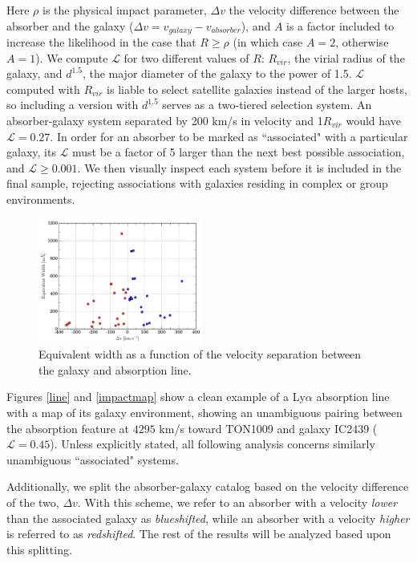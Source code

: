 \documentclass[iop]{emulateapj-rtx4}
\begin{document}
\noindent Here $\rho$ is the physical impact parameter, $\Delta v$ the velocity difference between the absorber and the galaxy ($\Delta v = v_{galaxy} - v_{absorber}$), and $A$ is a factor included to increase the likelihood in the case that $R \geq \rho$ (in which case $A = 2$, otherwise $A = 1$). We compute $\mathcal{L}$ for two different values of $R$: $R_{vir}$, the virial radius of the galaxy, and $d^{1.5}$, the major diameter of the galaxy to the power of 1.5. $\mathcal{L}$ computed with $R_{vir}$ is liable to select satellite galaxies instead of the larger hosts, so including a version with $d^{1.5}$ serves as a two-tiered selection system. An absorber-galaxy system separated by 200 km/s in velocity and 1$R_{vir}$ would have $\mathcal{L} = 0.27$. In order for an absorber to be marked as ``associated" with a particular galaxy, its $\mathcal{L}$ must be a factor of 5 larger than the next best possible association, and $\mathcal{L} \ge 0.001$. We then visually inspect each system before it is included in the final sample, rejecting associations with galaxies residing in complex or group environments.


\begin{figure}[h!]
        \centering
        \includegraphics[width=0.48\textwidth]{W(vel_diff).pdf}
        \caption{\small{Equivalent width as a function of the velocity separation between the galaxy and absorption line.}}
        \label{W_veldif}
        \vspace{5pt}
\end{figure} 

Figures \ref{line} and \ref{impactmap} show a clean example of a Ly$\alpha$ absorption line with a map of its galaxy environment, showing an unambiguous pairing between the absorption feature at $4295$ km/s toward TON1009 and galaxy IC2439 ($\mathcal{L} = 0.45$). Unless explicitly stated, all following analysis concerns similarly unambiguous ``associated" systems. 

Additionally, we split the absorber-galaxy catalog based on the velocity difference of the two, $\Delta v$. With this scheme, we refer to an absorber with a velocity \textit{lower} than the associated galaxy as \textit{blueshifted}, while an absorber with a velocity \textit{higher} is referred to as \textit{redshifted}. The rest of the results will be analyzed based upon this splitting. 
\end{document}
